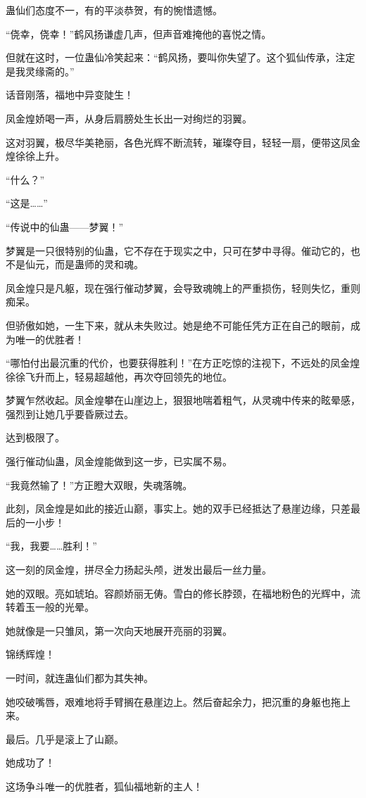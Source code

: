 \begin{this_body}
蛊仙们态度不一，有的平淡恭贺，有的惋惜遗憾。

“侥幸，侥幸！”鹤风扬谦虚几声，但声音难掩他的喜悦之情。

但就在这时，一位蛊仙冷笑起来：“鹤风扬，要叫你失望了。这个狐仙传承，注定是我灵缘斋的。”

话音刚落，福地中异变陡生！

凤金煌娇喝一声，从身后肩膀处生长出一对绚烂的羽翼。

这对羽翼，极尽华美艳丽，各色光辉不断流转，璀璨夺目，轻轻一扇，便带这凤金煌徐徐上升。

“什么？”

“这是……”

“传说中的仙蛊——梦翼！”

梦翼是一只很特别的仙蛊，它不存在于现实之中，只可在梦中寻得。催动它的，也不是仙元，而是蛊师的灵和魂。

凤金煌只是凡躯，现在强行催动梦翼，会导致魂魄上的严重损伤，轻则失忆，重则痴呆。

但骄傲如她，一生下来，就从未失败过。她是绝不可能任凭方正在自己的眼前，成为唯一的优胜者！

“哪怕付出最沉重的代价，也要获得胜利！”在方正吃惊的注视下，不远处的凤金煌徐徐飞升而上，轻易超越他，再次夺回领先的地位。

梦翼乍然收起。凤金煌攀在山崖边上，狠狠地喘着粗气，从灵魂中传来的眩晕感，强烈到让她几乎要昏厥过去。

达到极限了。

强行催动仙蛊，凤金煌能做到这一步，已实属不易。

“我竟然输了！”方正瞪大双眼，失魂落魄。

此刻，凤金煌是如此的接近山巅，事实上。她的双手已经抵达了悬崖边缘，只差最后的一小步！

“我，我要……胜利！”

这一刻的凤金煌，拼尽全力扬起头颅，迸发出最后一丝力量。

她的双眼。亮如琥珀。容颜娇丽无俦。雪白的修长脖颈，在福地粉色的光辉中，流转着玉一般的光晕。

她就像是一只雏凤，第一次向天地展开亮丽的羽翼。

锦绣辉煌！

一时间，就连蛊仙们都为其失神。

她咬破嘴唇，艰难地将手臂搁在悬崖边上。然后奋起余力，把沉重的身躯也拖上来。

最后。几乎是滚上了山巅。

她成功了！

这场争斗唯一的优胜者，狐仙福地新的主人！


\end{this_body}
